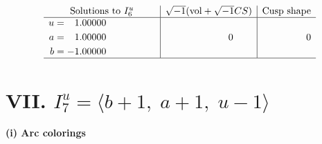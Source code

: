 \documentclass[1p]{elsarticle_modified}
\theoremstyle{definition}
\newcommand{\I}{\sqrt{-1}}
\begin{document}
$$\begin{array}{c|c|c}  
\text{Solutions to }I^u_{6}& \I (\text{vol} + \sqrt{-1}CS) & \text{Cusp shape}\\
 \hline 
\begin{aligned}
u &= \phantom{-}1.00000\phantom{ +0.000000I} \\
a &= \phantom{-}1.00000\phantom{ +0.000000I} \\
b &= -1.00000\phantom{ +0.000000I}\end{aligned}
 & \phantom{-0.000000 } 0 & \phantom{-0.000000 } 0\\
 \hline 
 \end{array}$$\newpage\newpage\renewcommand{\arraystretch}{1}
\centering \section*{VII. $I^u_{7}= \langle b+1,\;a+1,\;u-1 \rangle$}
\flushleft \textbf{(i) Arc colorings}\\
\end{document}
